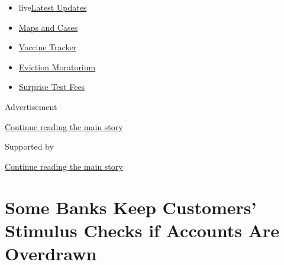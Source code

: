 \begin{itemize}
\tightlist
\item
  live\href{https://www.nytimes3xbfgragh.onion/2020/09/09/world/covid-19-coronavirus.html?name=styln-coronavirus-markets\&region=TOP_BANNER\&block=storyline_menu_recirc\&action=click\&pgtype=Article\&impression_id=dac9fec0-f2a8-11ea-8f04-735a2495ff97\&variant=undefined}{Latest
  Updates}
\item
  \href{https://www.nytimes3xbfgragh.onion/interactive/2020/us/coronavirus-us-cases.html?name=styln-coronavirus-markets\&region=TOP_BANNER\&block=storyline_menu_recirc\&action=click\&pgtype=Article\&impression_id=dac9fec1-f2a8-11ea-8f04-735a2495ff97\&variant=undefined}{Maps
  and Cases}
\item
  \href{https://www.nytimes3xbfgragh.onion/interactive/2020/science/coronavirus-vaccine-tracker.html?name=styln-coronavirus-markets\&region=TOP_BANNER\&block=storyline_menu_recirc\&action=click\&pgtype=Article\&impression_id=dac9fec2-f2a8-11ea-8f04-735a2495ff97\&variant=undefined}{Vaccine
  Tracker}
\item
  \href{https://www.nytimes3xbfgragh.onion/2020/09/02/your-money/eviction-moratorium-covid.html?name=styln-coronavirus-markets\&region=TOP_BANNER\&block=storyline_menu_recirc\&action=click\&pgtype=Article\&impression_id=dac9fec3-f2a8-11ea-8f04-735a2495ff97\&variant=undefined}{Eviction
  Moratorium}
\item
  \href{https://www.nytimes3xbfgragh.onion/2020/09/09/upshot/coronavirus-surprise-test-fees.html?name=styln-coronavirus-markets\&region=TOP_BANNER\&block=storyline_menu_recirc\&action=click\&pgtype=Article\&impression_id=dac9fec4-f2a8-11ea-8f04-735a2495ff97\&variant=undefined}{Surprise
  Test Fees}
\end{itemize}

Advertisement

\protect\hyperlink{after-top}{Continue reading the main story}

Supported by

\protect\hyperlink{after-sponsor}{Continue reading the main story}

\hypertarget{some-banks-keep-customers-stimulus-checks-if-accounts-are-overdrawn}{%
\section{Some Banks Keep Customers' Stimulus Checks if Accounts Are
Overdrawn}\label{some-banks-keep-customers-stimulus-checks-if-accounts-are-overdrawn}}

